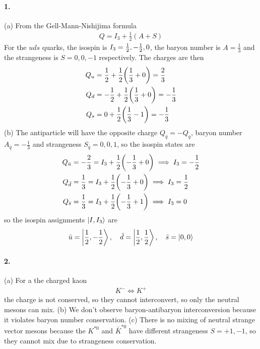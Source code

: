 \documentclass[../main.tex]{subfiles}
\begin{document}
\setcounter{section}{5}

\paragraph*{1.} (a) From the Gell-Mann-Nishijima formula
\begin{align*}
    Q = I_3 + \frac{1}{2}(A + S)
\end{align*}
For the $uds$ quarks, the isospin is $I_3 = \frac{1}{2}, -\frac{1}{2}, 0$, the baryon number is $A = \frac{1}{3}$
and the strangeness is $S = 0, 0, -1$ respectively. The charges are then
\begin{align*}
    Q_u &= \ohf + \frac{1}{2}\qt(\frac{1}{3} + 0)= \frac{2}{3} \\
    Q_d &= -\ohf + \frac{1}{2}\qt(\frac{1}{3} + 0)= -\frac{1}{3} \\
    Q_s &= 0 + \frac{1}{2}\qt(\frac{1}{3} - 1)= -\frac{1}{3}
\end{align*}
(b) The antiparticle will have the opposite charge $Q_{\bar{q}} = -Q_q$, baryon number
$A_{\bar q} = -\frac{1}{3}$ and strangeness $S_{\bar q} = 0, 0, 1$, so the isospin states are
\begin{align*}
    Q_{\bar{u}} &= -\frac{2}{3} = I_3 + \frac{1}{2}\qt(-\frac{1}{3} + 0)
        \implies I_3 = -\ohf \\
    Q_{\bar{d}} &= \frac{1}{3} = I_3 + \frac{1}{2}\qt(-\frac{1}{3} + 0)
        \implies I_3 = \ohf \\
    Q_{\bar{s}} &= \frac{1}{3} = I_3 + \frac{1}{2}\qt(-\frac{1}{3} + 1)
        \implies I_3 = 0
\end{align*}
so the isospin assignments $\ket{I, I_3}$ are
\begin{align*}
    \bar u = \ket{\frac{1}{2}, -\frac{1}{2}}, \quad \bar d = \ket{\frac{1}{2}, \frac{1}{2}}, \quad \bar s = \ket{0, 0}
\end{align*}

\paragraph*{2.} (a) For a the charged kaon
\begin{align*}
    K^- \Leftrightarrow K^+
\end{align*}
the charge is not conserved, so they cannot interconvert, so only the neutral mesons can mix.
(b) We don't observe baryon-antibaryon interconversion because it violates baryon number conservation.
(c) There is no mixing of neutral strange vector mesons because the $K^{*0}$ and $\bar{K}^{*0}$ have
different strangeness $S= +1, -1$, so they cannot mix due to strangeness conservation.
\end{document}
